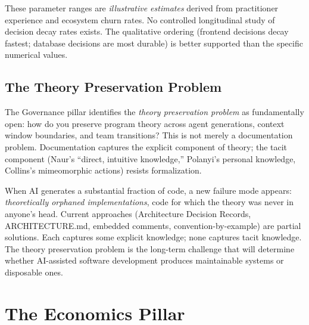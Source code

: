 \documentclass[11pt, a4paper]{googledeepmind}
\begin{document}
These parameter ranges are \emph{illustrative estimates} derived from practitioner experience and ecosystem churn rates. No controlled longitudinal study of decision decay rates exists. The qualitative ordering (frontend decisions decay fastest; database decisions are most durable) is better supported than the specific numerical values.

\subsection{The Theory Preservation Problem}

The Governance pillar identifies the \emph{theory preservation problem} as fundamentally open: how do you preserve program theory across agent generations, context window boundaries, and team transitions? This is not merely a documentation problem. Documentation captures the explicit component of theory; the tacit component (Naur's ``direct, intuitive knowledge,'' Polanyi's personal knowledge, Collins's mimeomorphic actions) resists formalization.

When AI generates a substantial fraction of code, a new failure mode appears: \emph{theoretically orphaned implementations}, code for which the theory was never in anyone's head. Current approaches (Architecture Decision Records, ARCHITECTURE.md, embedded comments, convention-by-example) are partial solutions. Each captures some explicit knowledge; none captures tacit knowledge. The theory preservation problem is the long-term challenge that will determine whether AI-assisted software development produces maintainable systems or disposable ones.


\section{The Economics Pillar}
\label{sec:economics}
\end{document}
